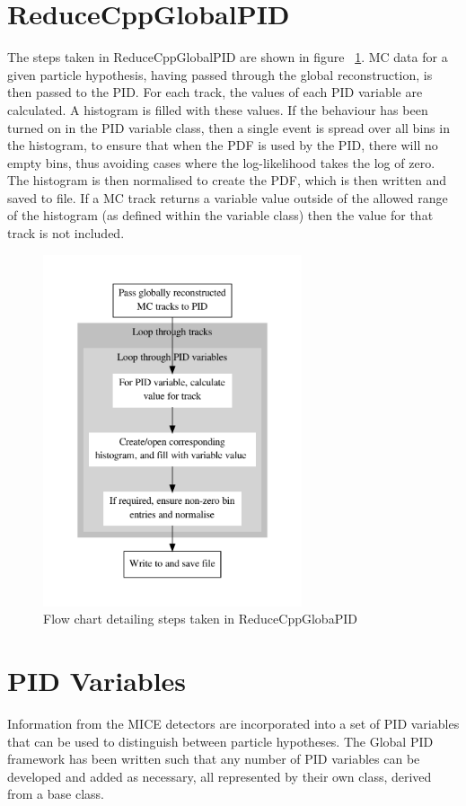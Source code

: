 \section{ReduceCppGlobalPID}
\label{pid_reducer}
The steps taken in ReduceCppGlobalPID are shown in figure ~\ref{reduceflow}. MC data for a given particle hypothesis, having passed through the global reconstruction, is then passed to the PID. For each track, the values of each PID variable are calculated. A histogram is filled with these values. If the behaviour has been turned on in the PID variable class, then a single event is spread over all bins in the histogram, to ensure that when the PDF is used by the PID, there will no empty bins, thus avoiding cases where the log-likelihood takes the log of zero. The histogram is then normalised to create the PDF, which is then written and saved to file.
If a MC track returns a variable value outside of the allowed range of the histogram (as defined within the variable class) then the value for that track is not included.
\begin{figure}[h!]
\begin{center} 
\includegraphics[width=3in]{reconstruction/globalpid/PDFflow.pdf} 
\caption{Flow chart detailing steps taken in ReduceCppGlobaPID}
\label{reduceflow}
\end{center} 
\end{figure}

\section{PID Variables}
\label{PID}
Information from the MICE detectors are incorporated into a set of 
PID variables that can be used to distinguish between particle 
hypotheses.
The Global PID framework has been written such that any number of PID 
variables can be developed and added as necessary, all represented by 
their own class, derived from a base class.

